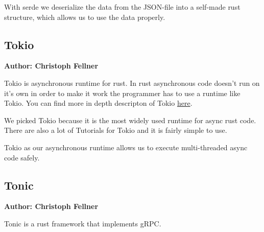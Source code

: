 With serde we deserialize the data from the JSON-file into a self-made rust structure, which allows us to use the data properly.  

\subsection{Tokio}
\textbf{Author: Christoph Fellner}

Tokio is asynchronous runtime for rust. In rust asynchronous code doesn't run on it's own in order to make it work the programmer has to use a runtime like Tokio. You can find more in depth descripton of Tokio \href{https://tokio.rs/tokio/tutorial}{here}. 

We picked Tokio because it is the most widely used runtime for async rust code. There are also a lot of Tutorials for Tokio and it is fairly simple to use.

Tokio as our asynchronous runtime allows us to execute multi-threaded async code safely.  

\subsection{Tonic}
\textbf{Author: Christoph Fellner}

Tonic is a rust framework that implements gRPC.

\filbreak

